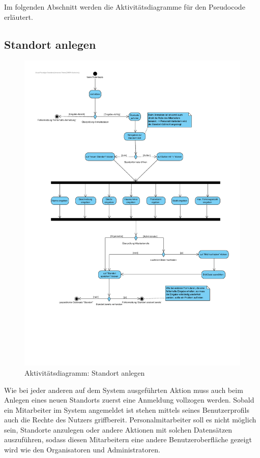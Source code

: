 Im folgenden Abschnitt werden die Aktivitätsdiagramme für den Pseudocode erläutert.

\newpage

\subsection{Standort anlegen}

\begin{figure}[!ht]
    \centering
    \includegraphics[width=\textwidth, height=\textheight-3cm, trim = 0cm 3cm 0cm 0cm]{Bilder/Diagramme/AD_Standort_anlegen.pdf}
    \caption{Aktivitätsdiagramm: Standort anlegen}
    \label{img:ad_standort}
\end{figure}

Wie bei jeder anderen auf dem System ausgeführten Aktion muss auch beim Anlegen eines neuen Standorts zuerst eine Anmeldung vollzogen werden. Sobald ein Mitarbeiter im System angemeldet ist stehen mittels seines Benutzerprofils auch die Rechte des Nutzers griffbereit. Personalmitarbeiter soll es nicht möglich sein, Standorte anzulegen oder andere Aktionen mit solchen Datensätzen auszuführen, sodass diesen Mitarbeitern eine andere Benutzeroberfläche gezeigt wird wie den Organisatoren und Administratoren. 


